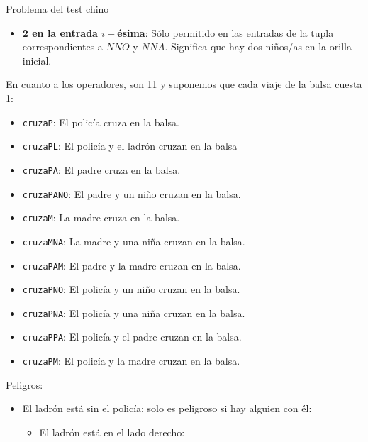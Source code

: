 \documentclass[11pt, a4paper, spanish, openright, twoside]{book}
\begin{document}
\begin{section}{Problema del test chino}
\begin{itemize}
	\item \textbf{2 en la entrada $i-$ésima}: Sólo permitido en las entradas de la tupla correspondientes a $NNO$ y $NNA$. Significa que hay dos niños/as en la orilla inicial.

\end{itemize}

En cuanto a los operadores, son 11 y suponemos que cada viaje de la balsa cuesta 1:

\begin{itemize}

	\item \texttt{cruzaP}: El policía cruza en la balsa.

	\item \texttt{cruzaPL}: El policía y el ladrón cruzan en la balsa

	\item \texttt{cruzaPA}: El padre cruza en la balsa.
	
	\item \texttt{cruzaPANO}: El padre y un niño cruzan en la balsa.
	
	\item \texttt{cruzaM}: La madre cruza en la balsa.
	
	\item \texttt{cruzaMNA}: La madre y una niña cruzan en la balsa.
	
	\item \texttt{cruzaPAM}: El padre y la madre cruzan en la balsa.
	
	\item \texttt{cruzaPNO}: El policía y un niño cruzan en la balsa.
	
	\item \texttt{cruzaPNA}: El policía y una niña cruzan en la balsa.
	
	\item \texttt{cruzaPPA}: El policía y el padre cruzan en la balsa.
	
	\item \texttt{cruzaPM}: El policía y la madre cruzan en la balsa.

\end{itemize}

	
	Peligros:
	\begin{itemize}
		\item El ladrón está sin el policía: solo es peligroso si hay alguien con él:
			\begin{itemize}
			\item El ladrón está en el lado derecho:
			

\end{itemize}
\end{itemize}
\end{section}
\end{document}
